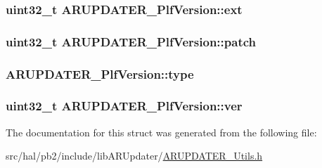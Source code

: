 \subsubsection[{\texorpdfstring{ext}{ext}}]{\setlength{\rightskip}{0pt plus 5cm}uint32\+\_\+t A\+R\+U\+P\+D\+A\+T\+E\+R\+\_\+\+Plf\+Version\+::ext}\hypertarget{struct_a_r_u_p_d_a_t_e_r___plf_version_a817be406399018d71407a6dd936965e2}{}\label{struct_a_r_u_p_d_a_t_e_r___plf_version_a817be406399018d71407a6dd936965e2}
\subsubsection[{\texorpdfstring{patch}{patch}}]{\setlength{\rightskip}{0pt plus 5cm}uint32\+\_\+t A\+R\+U\+P\+D\+A\+T\+E\+R\+\_\+\+Plf\+Version\+::patch}\hypertarget{struct_a_r_u_p_d_a_t_e_r___plf_version_aa3c52e9afcc5f55c11cebb42e13a5732}{}\label{struct_a_r_u_p_d_a_t_e_r___plf_version_aa3c52e9afcc5f55c11cebb42e13a5732}
\subsubsection[{\texorpdfstring{type}{type}}]{ A\+R\+U\+P\+D\+A\+T\+E\+R\+\_\+\+Plf\+Version\+::type}\hypertarget{struct_a_r_u_p_d_a_t_e_r___plf_version_ad632acaeefeb0f718b25434c5d867d37}{}\label{struct_a_r_u_p_d_a_t_e_r___plf_version_ad632acaeefeb0f718b25434c5d867d37}
\subsubsection[{\texorpdfstring{ver}{ver}}]{\setlength{\rightskip}{0pt plus 5cm}uint32\+\_\+t A\+R\+U\+P\+D\+A\+T\+E\+R\+\_\+\+Plf\+Version\+::ver}\hypertarget{struct_a_r_u_p_d_a_t_e_r___plf_version_aa2c25655524d9c3ac6c2b0318276fd25}{}\label{struct_a_r_u_p_d_a_t_e_r___plf_version_aa2c25655524d9c3ac6c2b0318276fd25}


The documentation for this struct was generated from the following file\+:\begin{DoxyCompactItemize}
\item 
src/hal/pb2/include/lib\+A\+R\+Updater/\hyperlink{_a_r_u_p_d_a_t_e_r___utils_8h}{A\+R\+U\+P\+D\+A\+T\+E\+R\+\_\+\+Utils.\+h}\end{DoxyCompactItemize}
